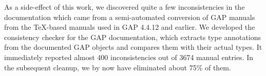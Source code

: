 As a side-effect of this work, we discovered quite a few inconsistencies in the \GAP
documentation which came from a semi-automated conversion of GAP manuals from the
\TeX-based manuals used in GAP 4.4.12 and earlier.  We developed the consistency checker
for the GAP documentation, which extracts type annotations from the documented GAP objects
and compares them with their actual types. It immediately reported almost 400
inconsistencies out of 3674 manual entries. In the subsequent cleanup, we by now have
eliminated about 75\% of them. 



